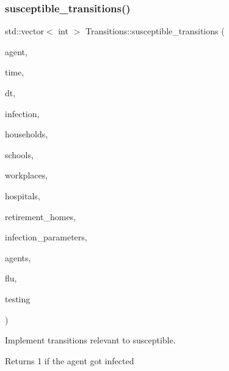 \subsubsection{\texorpdfstring{susceptible\+\_\+transitions()}{susceptible\_transitions()}}
{\footnotesize\ttfamily std\+::vector$<$ int $>$ Transitions\+::susceptible\+\_\+transitions (\begin{DoxyParamCaption}\item[{\hyperlink{classAgent}{Agent} \&}]{agent,  }\item[{const double}]{time,  }\item[{const double}]{dt,  }\item[{\hyperlink{classInfection}{Infection} \&}]{infection,  }\item[{std\+::vector$<$ \hyperlink{classHousehold}{Household} $>$ \&}]{households,  }\item[{std\+::vector$<$ \hyperlink{classSchool}{School} $>$ \&}]{schools,  }\item[{std\+::vector$<$ \hyperlink{classWorkplace}{Workplace} $>$ \&}]{workplaces,  }\item[{std\+::vector$<$ \hyperlink{classHospital}{Hospital} $>$ \&}]{hospitals,  }\item[{std\+::vector$<$ \hyperlink{classRetirementHome}{Retirement\+Home} $>$ \&}]{retirement\+\_\+homes,  }\item[{const std\+::map$<$ std\+::string, double $>$ \&}]{infection\+\_\+parameters,  }\item[{std\+::vector$<$ \hyperlink{classAgent}{Agent} $>$ \&}]{agents,  }\item[{\hyperlink{classFlu}{Flu} \&}]{flu,  }\item[{const \hyperlink{classTesting}{Testing} \&}]{testing }\end{DoxyParamCaption})}



Implement transitions relevant to susceptible. 

Returns 1 if the agent got infected \mbox{\label{classTransitions_ac2ff2ba74f316f7c30a29682960e44f6}} 
